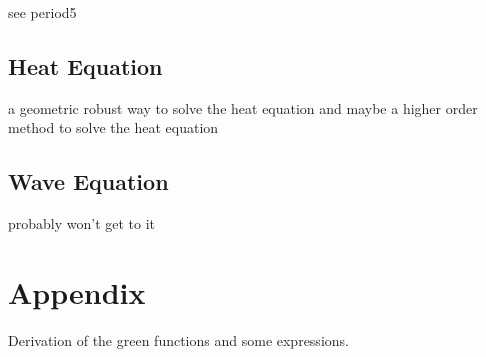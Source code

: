\documentclass[a4paper,12pt]{article}
\begin{document}
\begin{example}
    see period5
\end{example}

\subsection{Heat Equation}
a geometric robust way to solve the heat equation and maybe a higher order method to solve
the heat equation

\subsection{Wave Equation}
probably won't get to it

\newpage
\printbibliography
\newpage

\section{Appendix}
Derivation of the green functions and some expressions.
\end{document}
